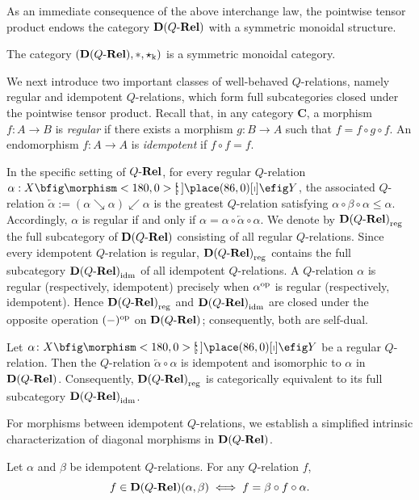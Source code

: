 \documentclass{tac}
\begin{document}
As an immediate consequence of the above interchange law, the pointwise tensor product endows the category ${\mathbf{D}(Q\text{-}\mathbf{Rel})}$ with a symmetric monoidal structure.

\begin{corollary}\label{cor:d-monoidal}
The category $({\mathbf{D}(Q\text{-}\mathbf{Rel})},*,{\star_\mathrm{k}})$ is a symmetric monoidal category.
\end{corollary}

We next introduce two important classes of well-behaved $Q$-relations, namely regular and idempotent $Q$-relations, which form full subcategories closed under the pointwise tensor product. Recall that, in any category $\mathbf{C}$, a morphism $f:A\to B$ is \emph{regular} if there exists a morphism $g:B\to A$ such that $f=f\circ g\circ f$. An endomorphism $f:A\to A$ is \emph{idempotent} if $f\circ f=f$.

In the specific setting of $Q\text{-}\mathbf{Rel}$, for every regular $Q$-relation $\alpha:X\nto Y$, the associated $Q$-relation $\overleftarrow{\alpha}:=(\alpha\searrow\alpha)\swarrow\alpha$ is the greatest $Q$-relation satisfying $\alpha\circ\beta\circ\alpha\leq\alpha$. Accordingly, $\alpha$ is regular if and only if $\alpha=\alpha\circ\overleftarrow{\alpha}\circ\alpha$. We denote by \({\mathbf{D}(Q\text{-}\mathbf{Rel})}_{\mathrm{reg}}\) the full subcategory of \({\mathbf{D}(Q\text{-}\mathbf{Rel})}\) consisting of all regular \(Q\)-relations. Since every idempotent \(Q\)-relation is regular, \({\mathbf{D}(Q\text{-}\mathbf{Rel})}_{\mathrm{reg}}\) contains the full subcategory \({\mathbf{D}(Q\text{-}\mathbf{Rel})}_{\mathrm{idm}}\) of all idempotent \(Q\)-relations. A \(Q\)-relation \(\alpha\) is regular (respectively, idempotent) precisely when \(\alpha^{\mathrm{op}}\) is regular (respectively, idempotent). Hence \({\mathbf{D}(Q\text{-}\mathbf{Rel})}_{\mathrm{reg}}\) and \({\mathbf{D}(Q\text{-}\mathbf{Rel})}_{\mathrm{idm}}\) are closed under the opposite operation \((-)^{\mathrm{op}}\) on \({\mathbf{D}(Q\text{-}\mathbf{Rel})}\); consequently, both are self-dual.

\begin{proposition}\label{prop:reg-idm-equiv}
Let $\alpha\colon X\nto Y$ be a regular $Q$-relation. Then the $Q$-relation $\overleftarrow{\alpha}\circ\alpha$ is idempotent and isomorphic to $\alpha$ in ${\mathbf{D}(Q\text{-}\mathbf{Rel})}$. Consequently, ${\mathbf{D}(Q\text{-}\mathbf{Rel})}_{\mathrm{reg}}$ is categorically equivalent to its full subcategory ${\mathbf{D}(Q\text{-}\mathbf{Rel})}_{\mathrm{idm}}$.
\end{proposition}

For morphisms between idempotent $Q$-relations, we establish a simplified intrinsic characterization of diagonal morphisms in ${\mathbf{D}(Q\text{-}\mathbf{Rel})}$.

\begin{proposition}\label{prop:idm-morph}
Let $\alpha$ and $\beta$ be idempotent $Q$-relations. For any $Q$-relation $f$,
\[
f\in{\mathbf{D}(Q\text{-}\mathbf{Rel})}(\alpha,\beta)
\iff f=\beta\circ f\circ\alpha.
\]
\end{proposition}
\end{document}
